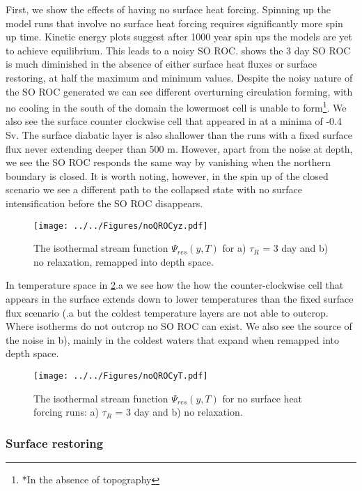First, we show the effects of having no surface heat forcing. Spinning up the model runs that involve no surface heat forcing requires significantly more spin up time. Kinetic energy plots suggest after 1000 year spin ups the models are yet to achieve equilibrium. This leads to a noisy SO ROC.  shows the 3 day SO ROC is much diminished in the absence of either surface heat fluxes or surface restoring, at half the maximum and minimum values. Despite the noisy nature of the SO ROC generated we can see different overturning circulation forming, with no cooling in the south of the domain the lowermost cell is unable to form\footnote{*In the absence of topography}. We also see the surface counter clockwise cell that appeared in  at a minima of -0.4 Sv. The surface diabatic layer is also shallower than the runs with a fixed surface flux never extending deeper than 500 m. However, apart from the noise at depth, we see the SO ROC responds the same way by vanishing when the northern boundary is closed. It is worth noting, however, in the spin up of the closed scenario we see a different path to the collapsed state with no surface intensification before the SO ROC disappears.
\begin{figure}[H]
\center
\noindent \texttt{[image: ../../Figures/noQROCyz.pdf]}
\caption{The isothermal stream function $\Psi_{res}(y,T)$ for a) $\tau _R$ = 3 day and b) no relaxation, remapped into depth space.}
\label{fig:noqrocyz}
\end{figure}
In temperature space in \ref{fig:noqrocyT}.a we see how the how the counter-clockwise cell that appears in the surface extends down to lower temperatures than the fixed surface flux scenario (.a but the coldest temperature layers are not able to outcrop. Where isotherms do not outcrop no SO ROC can exist. We also see the source of the noise in b), mainly in the coldest waters that expand when remapped into depth space. 

\begin{figure}[H]
\center
\noindent \texttt{[image: ../../Figures/noQROCyT.pdf]}
\caption{The isothermal stream function $\Psi_{res}(y,T)$ for no surface heat forcing runs: a) $\tau _R$ = 3 day and b) no relaxation.}
\label{fig:noqrocyT}
\end{figure}



\subsubsection*{Surface restoring}

